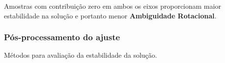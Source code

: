 Amostras com contribuição zero em ambos os eixos proporcionam maior 
estabilidade na solução e portanto menor \textbf{Ambiguidade Rotacional}. 

\subsubsection{Pós-processamento do ajuste}
Métodos para avaliação da estabilidade da solução.

 
% 
%

